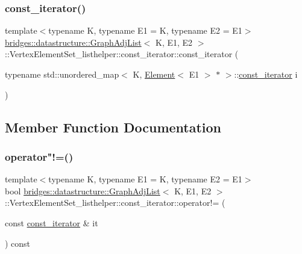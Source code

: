 \subsubsection{\texorpdfstring{const\+\_\+iterator()}{const\_iterator()}}
{\footnotesize\ttfamily template$<$typename K, typename E1 = K, typename E2 = E1$>$ \\
\mbox{\hyperlink{classbridges_1_1datastructure_1_1_graph_adj_list}{bridges\+::datastructure\+::\+Graph\+Adj\+List}}$<$ K, E1, E2 $>$\+::Vertex\+Element\+Set\+\_\+listhelper\+::const\+\_\+iterator\+::const\+\_\+iterator (\begin{DoxyParamCaption}\item[{typename std\+::unordered\+\_\+map$<$ K, \mbox{\hyperlink{classbridges_1_1datastructure_1_1_element}{Element}}$<$ E1 $>$ $\ast$ $>$\+::\mbox{\hyperlink{classbridges_1_1datastructure_1_1_graph_adj_list_1_1_vertex_element_set__listhelper_1_1const__iterator}{const\+\_\+iterator}}}]{i }\end{DoxyParamCaption})\hspace{0.3cm}{\ttfamily [inline]}}



\subsection{Member Function Documentation}
\mbox{\label{classbridges_1_1datastructure_1_1_graph_adj_list_1_1_vertex_element_set__listhelper_1_1const__iterator_ac7ce05d2bf7491005acf6e4a668cea1b}} 
\subsubsection{\texorpdfstring{operator"!=()}{operator!=()}}
{\footnotesize\ttfamily template$<$typename K, typename E1 = K, typename E2 = E1$>$ \\
bool \mbox{\hyperlink{classbridges_1_1datastructure_1_1_graph_adj_list}{bridges\+::datastructure\+::\+Graph\+Adj\+List}}$<$ K, E1, E2 $>$\+::Vertex\+Element\+Set\+\_\+listhelper\+::const\+\_\+iterator\+::operator!= (\begin{DoxyParamCaption}\item[{const \mbox{\hyperlink{classbridges_1_1datastructure_1_1_graph_adj_list_1_1_vertex_element_set__listhelper_1_1const__iterator}{const\+\_\+iterator}} \&}]{it }\end{DoxyParamCaption}) const\hspace{0.3cm}{\ttfamily [inline]}}


